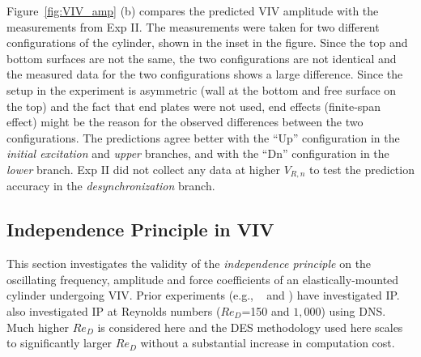 Figure~\ref{fig:VIV_amp} (b) compares the predicted VIV amplitude with the
measurements from Exp II. The measurements were taken for two different
configurations of the cylinder, shown in the inset in the figure. Since the top
and bottom surfaces are not the same, the two configurations are not identical
and the measured data for the two configurations shows a large difference.
Since the setup in the experiment is asymmetric (wall at the bottom and free
surface on the top) and the fact that end plates were not used, end effects
(finite-span effect) might be the reason for the observed differences between
the two configurations. The predictions agree better with the ``Up''
configuration in the {\em initial excitation} and {\em upper} branches, and
with the ``Dn'' configuration in the {\em lower} branch. Exp II did not collect
any data at higher $V_{R,n}$ to test the prediction accuracy in the {\em
desynchronization} branch.

\subsection{Independence Principle in VIV}
\label{sec:IPinVIV}
%
This section investigates the validity of the {\em independence principle} on
the oscillating frequency, amplitude and force coefficients of an
elastically-mounted cylinder undergoing VIV. Prior experiments (e.g.,
~\citet{jain2013vortex} and \citet{franzini2013one}) have investigated IP.
\citet{zhao2015validity} also investigated IP at Reynolds numbers ($Re_D$=150
and $1,000$) using DNS. Much higher $Re_D$ is considered here and the DES
methodology used here scales to significantly larger $Re_D$ without a
substantial increase in computation cost.

